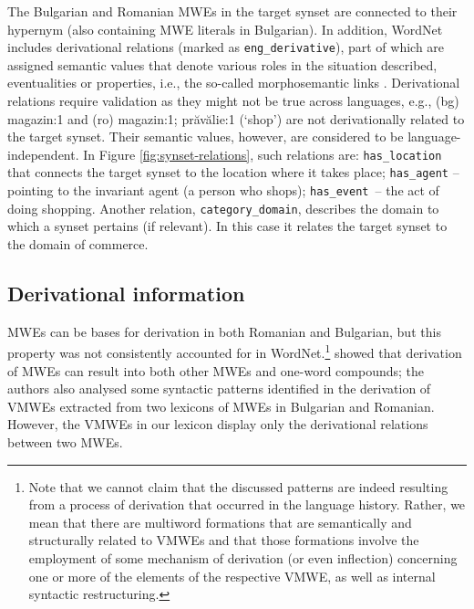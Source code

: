 \documentclass[output=paper,colorlinks,citecolor=brown]{langscibook}
\begin{document}
The Bulgarian and Romanian MWEs in the target synset are connected to their hypernym (also containing MWE literals in Bulgarian). 
In addition, WordNet includes derivational relations (marked as \texttt{eng\_derivative}), part of which are assigned semantic values that denote various roles in the situation described, eventualities or properties, i.e., the so-called morphosemantic links \citep{fellbaum-et-al2009}. Derivational relations require validation as they might not be true across languages, e.g., (bg) magazin:1 and (ro) magazin:1; prăvălie:1 (`shop') are not derivationally related to the target synset. Their semantic values, however, are considered to be language-independent. In %
Figure \ref{fig:synset-relations}, such relations are: \texttt{has\_location} that connects the target synset to the location where it takes place; \texttt{has\_agent} -- pointing to the invariant agent (a person who shops); \texttt{has\_event}~-- the act of doing shopping. Another relation, \texttt{category\_domain}, describes the domain to which a synset pertains (if relevant). In this case it relates the target synset to the domain of commerce.


\subsection{Derivational information} \label{sec:derivrel}

MWEs can be bases for derivation in both Romanian and Bulgarian, but this property was not consistently accounted for in WordNet.\footnote{Note that we cannot claim that the discussed patterns are indeed resulting from a process of derivation that occurred in the language history. Rather, we mean that there are multiword formations that are semantically and structurally related to VMWEs and that those formations involve the employment of some mechanism of derivation (or even inflection) concerning one or more of the elements of the respective VMWE, as well as internal syntactic restructuring.} %
\citet{barbu-mititelu-leseva-2018} showed that derivation of MWEs can result into both other MWEs and one-word compounds; the authors also analysed some syntactic patterns identified in the derivation of VMWEs extracted from two lexicons of MWEs in Bulgarian and Romanian. However, the VMWEs in our lexicon display only the derivational relations between two MWEs.
\end{document}
